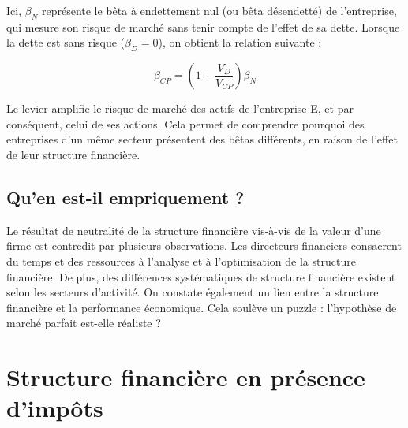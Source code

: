 \documentclass[a4paper, 12pt]{report}
\begin{document}
Ici, \( \beta_N \) représente le bêta à endettement nul (ou bêta désendetté) de l'entreprise, qui mesure son risque de marché sans tenir compte de l'effet de sa dette. Lorsque la dette est sans risque (\( \beta_D = 0 \)), on obtient la relation suivante :

\[
\beta_{CP} = \left(1 + \frac{V_D}{V_{CP}}\right) \beta_N
\]

Le levier amplifie le risque de marché des actifs de l'entreprise E, et par conséquent, celui de ses actions. Cela permet de comprendre pourquoi des entreprises d'un même secteur présentent des bêtas différents, en raison de l'effet de leur structure financière.

\section{Qu'en est-il empriquement ?}

Le résultat de neutralité de la structure financière vis-à-vis de la valeur d’une firme est contredit par plusieurs observations. Les directeurs financiers consacrent du temps et des ressources à l'analyse et à l'optimisation de la structure financière. De plus, des différences systématiques de structure financière existent selon les secteurs d'activité. On constate également un lien entre la structure financière et la performance économique. Cela soulève un puzzle : l'hypothèse de marché parfait est-elle réaliste ?

\chapter{Structure financière en présence d'impôts}
\end{document}
